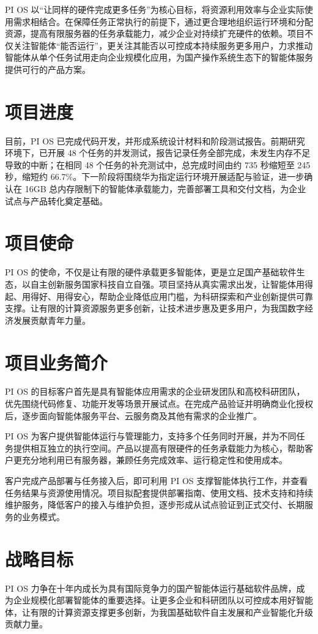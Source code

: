 PI OS 以“让同样的硬件完成更多任务”为核心目标，将资源利用效率与企业实际使用需求相结合。在保障任务正常执行的前提下，通过更合理地组织运行环境和分配资源，提高有限服务器的任务承载能力，减少企业对持续扩充硬件的依赖。项目不仅关注智能体“能否运行”，更关注其能否以可控成本持续服务更多用户，力求推动智能体从单个任务试用走向企业规模化应用，为国产操作系统生态下的智能体服务提供可行的产品方案。

\section{项目进度}\label{sec:2.3}
目前，PI OS 已完成代码开发，并形成系统设计材料和阶段测试报告。前期研究环境下，已开展 48 个任务的并发测试，报告记录任务全部完成，未发生内存不足导致的中断；在相同 48 个任务的补充测试中，总完成时间由约 735 秒缩短至 245 秒，缩短约 66.7\%。下一阶段将围绕华为指定运行环境开展适配与验证，进一步确认在 16GB 总内存限制下的智能体承载能力，完善部署工具和交付文档，为企业试点与产品转化奠定基础。

\section{项目使命}\label{sec:2.4}
PI OS 的使命，不仅是让有限的硬件承载更多智能体，更是立足国产基础软件生态，以自主创新服务国家科技自立自强。项目坚持从真实需求出发，让智能体用得起、用得好、用得安心，帮助企业降低应用门槛，为科研探索和产业创新提供可靠支撑。让有限的计算资源服务更多创新，让技术进步惠及更多用户，为我国数字经济发展贡献青年力量。

\section{项目业务简介}\label{sec:2.5}
PI OS 的目标客户首先是具有智能体应用需求的企业研发团队和高校科研团队，优先围绕代码修复、功能开发等场景开展试点。在完成产品验证并明确商业化授权后，逐步面向智能体服务平台、云服务商及其他有需求的企业推广。

PI OS 为客户提供智能体运行与管理能力，支持多个任务同时开展，并为不同任务提供相互独立的执行空间。产品以提高有限硬件的任务承载能力为核心，帮助客户更充分地利用已有服务器，兼顾任务完成效率、运行稳定性和使用成本。

客户完成产品部署与任务接入后，即可利用 PI OS 支撑智能体执行工作，并查看任务结果与资源使用情况。项目拟配套提供部署指南、使用文档、技术支持和持续维护服务，降低客户的接入与维护负担，逐步形成从试点验证到正式交付、长期服务的业务模式。

\section{战略目标}\label{sec:2.6}
PI OS 力争在十年内成长为具有国际竞争力的国产智能体运行基础软件品牌，成为企业规模化部署智能体的重要选择。让更多企业和科研团队以可控成本用好智能体，让有限的计算资源支撑更多创新，为我国基础软件自主发展和产业智能化升级贡献力量。

